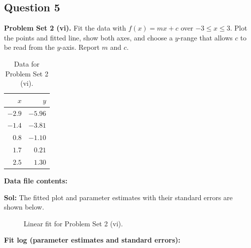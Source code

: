 \documentclass{book}
\begin{document}
\subsection*{Question 5}
\noindent\textbf{Problem Set 2 (vi).} Fit the data with $f(x)=mx+c$ over $-3\le x\le3$. Plot the points and fitted line, show both axes, and choose a $y$-range that allows $c$ to be read from the $y$-axis. Report $m$ and $c$.
\begin{table}[H]
\centering
\caption{Data for Problem Set 2 (vi).}
\begin{tabular}{|r|r|}
\hline
$x$ & $y$ \\ \hline
$-2.9$ & $-5.96$ \\ \hline
$-1.4$ & $-3.81$ \\ \hline
$0.8$ & $-1.10$ \\ \hline
$1.7$ & $0.21$ \\ \hline
$2.5$ & $1.30$ \\ \hline
\end{tabular}
\end{table}
\noindent\textbf{Data file contents:}

\noindent\textbf{Sol:} The fitted plot and parameter estimates with their standard errors are shown below.

\begin{figure}[H]
    \centering
    
    \caption{Linear fit for Problem Set 2 (vi).}
\end{figure}
\noindent\textbf{Fit log (parameter estimates and standard errors):}

\newpage
\end{document}
